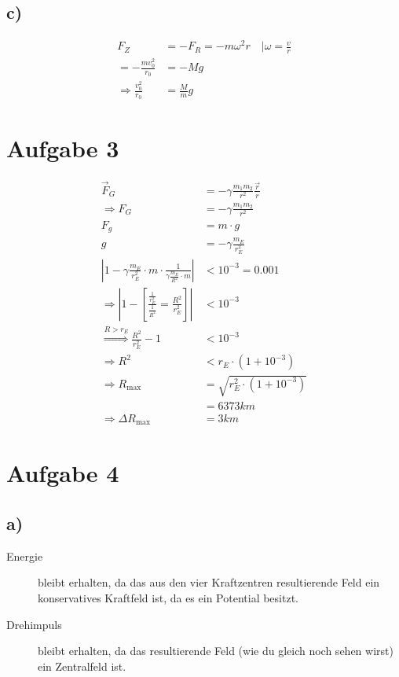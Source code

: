 \documentclass[12pt,a4paper,notitlepage]{article}
\newcommand{\aufgabe}[1]{\section*{\setcounter{section}{#1}Aufgabe #1}}
\begin{document}
\subsection*{c)}
\begin{align}
F_Z&=-F_R=-m\omega^2r\quad\Big|\omega=\frac{v}{r}\\
=-\frac{mv_0^2}{r_0}&=-Mg\\
\Rightarrow\frac{v_0^2}{r_0}&=\frac{M}{m}g
\end{align}
\aufgabe{3}
\begin{align}
\vec F_G&=-\gamma\frac{m_1m_2}{r^2}\frac{\vec r}{r}\\
\Rightarrow F_G&=-\gamma\frac{m_1m_2}{r^2}\\
F_g&=m\cdot g\\
g&=-\gamma\frac{m_E}{r_E^2}\\
\left|1-\gamma\frac{m_E}{r_E^2}\cdot m\cdot\frac{1}{\gamma\frac{m_E}{R^2}\cdot m}\right|&<10^{-3}=0.001\\
\Rightarrow\left|1-\left[\frac{\frac{1}{r_E^2}}{\frac{1}{R^2}}=\frac{R^2}{r_E^2}\right]\right|&<10^{-3}\\
\stackrel{R>r_E}{\Rightarrow}\frac{R^2}{r_E^2}-1&<10^{-3}\\
\Rightarrow R^2&<r_E\cdot\left(1+10^{-3}\right)\\
\Rightarrow R_{\text{max}}&=\sqrt{r_E^2\cdot\left(1+10^{-3}\right)}\\
&=6373km\\
\Rightarrow\Delta R_{\text{max}}&=3km
\end{align}
\aufgabe{4}
\subsection*{a)}
\begin{description}
\item[Energie] bleibt erhalten, da das aus den vier Kraftzentren resultierende Feld ein konservatives Kraftfeld ist, da es ein Potential besitzt.
\item[Drehimpuls] bleibt erhalten, da das resultierende Feld (wie du gleich noch sehen wirst) ein Zentralfeld ist.
\end{description}
\end{document}

